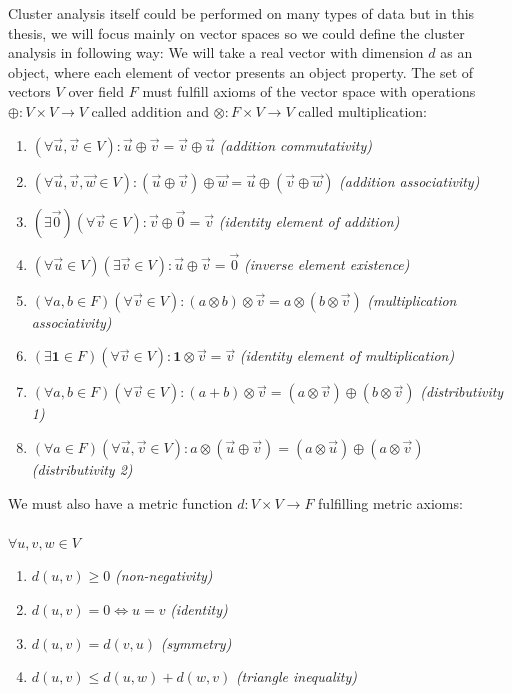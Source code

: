 Cluster analysis itself could be performed on many types of data but in this thesis, we will focus mainly on vector spaces so we could define the cluster analysis in following way:
We will take a real vector with dimension $d$ as an object, where each element of vector presents an object property. The set of vectors $V$ over field $F$ must fulfill axioms of the vector space with operations $\oplus: V \times V \to V$ called addition and $\otimes:F \times V \to V$ called multiplication:
\begin{enumerate}
\item $(\forall \vec{u}, \vec{v} \in V):\vec{u} \oplus \vec{v} = \vec{v} \oplus \vec{u}$ \textit{(addition commutativity)}
\item $(\forall \vec{u}, \vec{v}, \vec{w} \in V):(\vec{u} \oplus \vec{v}) \oplus \vec{w} = \vec{u} \oplus (\vec{v} \oplus \vec{w})$ \textit{(addition associativity)}
\item $(\exists \vec{0})(\forall \vec{v} \in V):\vec{v} \oplus \vec{0} = \vec{v}$ \textit{(identity element of addition)}
\item $(\forall \vec{u} \in V)(\exists \vec{v} \in V):\vec{u} \oplus \vec{v} = \vec{0}$ \textit{(inverse element existence)}
\item $(\forall a,b \in F)(\forall \vec{v} \in V):(a \otimes b) \otimes \vec{v} = a \otimes (b \otimes \vec{v})$ \textit{(multiplication associativity)}
\item $(\exists \textbf{1} \in F)(\forall \vec{v} \in V):\textbf{1} \otimes \vec{v} = \vec{v}$ \textit{(identity element of multiplication)}
\item $(\forall a,b \in F)(\forall \vec{v} \in V):(a + b) \otimes \vec{v} = (a \otimes \vec{v}) \oplus (b \otimes \vec{v})$ \textit{(distributivity 1)}
\item $(\forall a \in F)(\forall \vec{u}, \vec{v} \in V):a \otimes (\vec{u} \oplus \vec{v}) = (a \otimes \vec{u}) \oplus (a \otimes \vec{v})$ \textit{(distributivity 2)}
\end{enumerate}

We must also have a metric function $d:V \times V \to F$ fulfilling metric axioms:\\ \\
$ \forall  u, v, w \in V$
\begin{enumerate}
\item $d(u, v)\geq 0$ \textit{(non-negativity)}
\item $d(u, v) = 0 \iff u = v$ \textit{(identity)}
\item $d(u, v) = d(v, u)$ \textit{(symmetry)}
\item$d(u, v) \leq d(u, w) + d(w, v)$ \textit{(triangle inequality)}
\end{enumerate}

